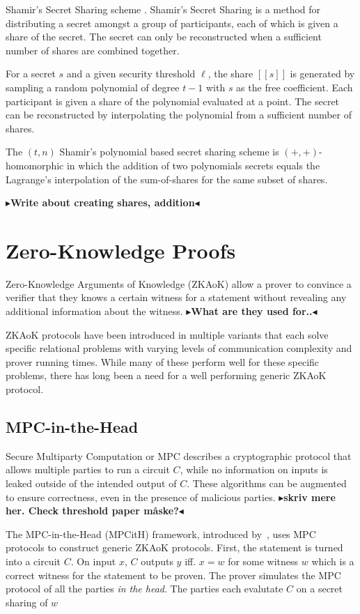 \documentclass[twoside,11pt,openright]{report}
\theoremstyle{definition}
\theoremstyle{plain}
\newcommand{\todo}[1]{{\color[rgb]{.5,0,0}\textbf{$\blacktriangleright$#1$\blacktriangleleft$}}}
\begin{document}
Shamir's Secret Sharing scheme \cite{shamir1979share}. Shamir's Secret Sharing is a method for distributing a secret amongst a group of participants, each of which is given a share of the secret. The secret can only be reconstructed when a sufficient number of shares are combined together.

For a secret $s$ and a given security threshold $\ell$, the share $[[s]]$ is generated by sampling a random polynomial of degree $t-1$ with $s$ as the free coefficient. Each participant is given a share of the polynomial evaluated at a point. The secret can be reconstructed by interpolating the polynomial from a sufficient number of shares.

The $(t,n)$ Shamir's polynomial based secret sharing scheme is $(+,+)$-homomorphic in which the addition of two polynomials secrets equals the Lagrange's interpolation of the sum-of-shares for the same subset of shares.

\todo{Write about creating shares, addition}

\section{Zero-Knowledge Proofs}
\label{sec:zkp}

Zero-Knowledge Arguments of Knowledge (ZKAoK) allow a prover to convince a verifier that they knows a certain witness for a statement without revealing any additional information about the witness. \todo{What are they used for..}

ZKAoK protocols have been introduced in multiple variants that each solve specific relational problems with varying levels of communication complexity and prover running times. While many of these perform well for these specific problems, there has long been a need for a well performing generic ZKAoK protocol.

\subsection{MPC-in-the-Head}
\label{sec:mpcith}

Secure Multiparty Computation or MPC describes a cryptographic protocol that allows multiple parties to run a circuit $C$, while no information on inputs is leaked outside of the intended output of $C$. These algorithms can be augmented to ensure correctness, even in the presence of malicious parties. \todo{skriv mere her. Check threshold paper måske?}

The MPC-in-the-Head (MPCitH) framework, introduced by~\cite{ishai2007zero}, uses MPC protocols to construct generic ZKAoK protocols. First, the statement is turned into a circuit $C$. On input $x$, $C$ outputs $y$ iff. $x = w$ for some witness $w$ which is a correct witness for the statement to be proven. The prover simulates the MPC protocol of all the parties \textit{in the head}. The parties each evalutate $C$ on a secret sharing of $w$
\end{document}
